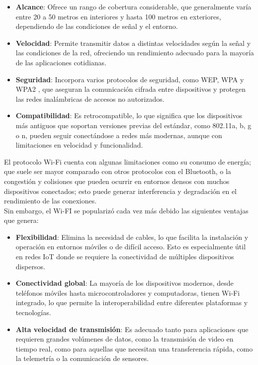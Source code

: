 \begin{itemize}
    \item \textbf{Alcance}: Ofrece un rango de cobertura considerable, que generalmente varía entre 20 a 50 metros en interiores y hasta 100 metros en exteriores, dependiendo de las condiciones de señal y el entorno.
    
    \item \textbf{Velocidad}: Permite transmitir datos a distintas velocidades según la señal y las condiciones de la red, ofreciendo un rendimiento adecuado para la mayoría de las aplicaciones cotidianas.
    
    \item \textbf{Seguridad}: Incorpora varios protocolos de seguridad, como WEP, WPA y WPA2 \cite{wifi_security}, que aseguran la comunicación cifrada entre dispositivos y protegen las redes inalámbricas de accesos no autorizados.
    
    \item \textbf{Compatibilidad}: Es retrocompatible, lo que significa que los dispositivos más antiguos que soportan versiones previas del estándar, como 802.11a, b, g o n, pueden seguir conectándose a redes más modernas, aunque con limitaciones en velocidad y funcionalidad.
    
   
\end{itemize}






El protocolo Wi-Fi cuenta con algunas limitaciones como su consumo de energía; que suele ser mayor comparado con otros protocolos con el Bluetooth, o la congestión y colisiones que pueden ocurrir en entornos densos con muchos dispositivos conectados; esto puede generar interferencia y degradación en el rendimiento de las conexiones. \\

Sin embargo, el Wi-FI se popularizó cada vez más debido las siguientes ventajas que genera:

\begin{itemize}
    
    \item \textbf{Flexibilidad}: Elimina la necesidad de cables, lo que facilita la instalación y operación en entornos móviles o de difícil acceso. Esto es especialmente útil en redes IoT donde se requiere la conectividad de múltiples dispositivos dispersos.

    
    \item \textbf{Conectividad global}: La mayoría de los dispositivos modernos, desde teléfonos móviles hasta microcontroladores y computadoras, tienen Wi-Fi integrado, lo que permite la interoperabilidad entre diferentes plataformas y tecnologías.

    \item \textbf{Alta velocidad de transmisión}: Es adecuado tanto para aplicaciones que requieren grandes volúmenes de datos, como la transmisión de video en tiempo real, como para aquellas que necesitan una transferencia rápida, como la telemetría o la comunicación de sensores.
\end{itemize}


